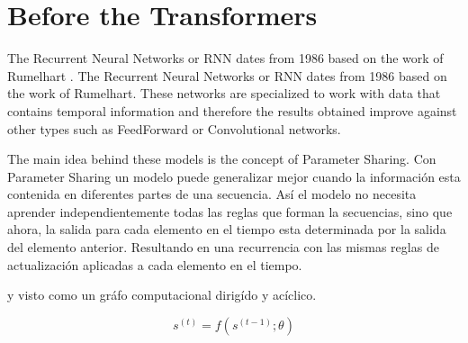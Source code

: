 
\section{Before the Transformers}


The Recurrent Neural Networks or RNN dates from 1986 based on the work of Rumelhart
\cite{Rumelhart}.
The Recurrent Neural Networks or RNN dates from 1986 based on the work of Rumelhart. These networks
are specialized to work with data that contains temporal information and therefore the results
obtained improve against other types such as FeedForward or Convolutional networks.


The main idea behind these models is the concept of Parameter Sharing. Con Parameter Sharing un
modelo puede generalizar mejor cuando la información esta contenida en diferentes partes de una
secuencia. Así el modelo no necesita aprender independientemente todas las reglas que forman la
secuencias, sino que ahora, la salida para cada elemento en el tiempo esta determinada por la
salida del elemento anterior. Resultando en una recurrencia con las mismas reglas de actualización
aplicadas a cada elemento en el tiempo.

y visto como un gráfo computacional dirigído y acíclico.

\begin{equation}
    s^{(t)} = f(s^{(t-1)}; \theta)
\end{equation}
